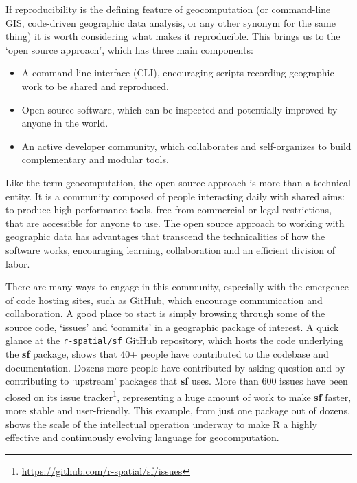 \documentclass[]{krantz}
\providecommand{\tightlist}{%
  \setlength{\itemsep}{0pt}\setlength{\parskip}{0pt}}
\let\rmarkdownfootnote\footnote%
\def\footnote{\protect\rmarkdownfootnote}
\renewcommand{\href}[2]{#2\footnote{\url{#1}}}
\begin{document}
If reproducibility is the defining feature of geocomputation (or command-line GIS, code-driven geographic data analysis, or any other synonym for the same thing) it is worth considering what makes it reproducible.
This brings us to the `open source approach', which has three main components:

\begin{itemize}
\tightlist
\item
  A command-line interface (CLI), encouraging scripts recording geographic work to be shared and reproduced.
\item
  Open source software, which can be inspected and potentially improved by anyone in the world.
\item
  An active developer community, which collaborates and self-organizes to build complementary and modular tools.
\end{itemize}

Like the term geocomputation, the open source approach is more than a technical entity.
It is a community composed of people interacting daily with shared aims: to produce high performance tools, free from commercial or legal restrictions, that are accessible for anyone to use.
The open source approach to working with geographic data has advantages that transcend the technicalities of how the software works, encouraging learning, collaboration and an efficient division of labor.

There are many ways to engage in this community, especially with the emergence of code hosting sites, such as GitHub, which encourage communication and collaboration.
A good place to start is simply browsing through some of the source code, `issues' and `commits' in a geographic package of interest.
A quick glance at the \texttt{r-spatial/sf} GitHub repository, which hosts the code underlying the \textbf{sf} package, shows that 40+ people have contributed to the codebase and documentation.
Dozens more people have contributed by asking question and by contributing to `upstream' packages that \textbf{sf} uses.
More than 600 issues have been closed on its \href{https://github.com/r-spatial/sf/issues}{issue tracker}, representing a huge amount of work to make \textbf{sf} faster, more stable and user-friendly.
This example, from just one package out of dozens, shows the scale of the intellectual operation underway to make R a highly effective and continuously evolving language for geocomputation.
\end{document}
